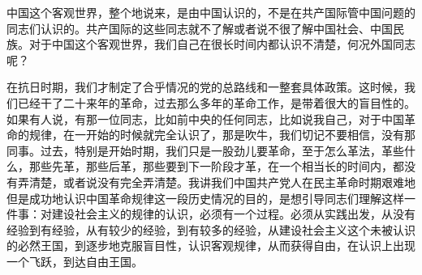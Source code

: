 中国这个客观世界，整个地说来，是由中国认识的，不是在共产国际管中国问题的同志们认识的。共产国际的这些同志就不了解或者说不很了解中国社会、中国民族。对于中国这个客观世界，我们自己在很长时间内都认识不清楚，何况外国同志呢？

在抗日时期，我们才制定了合乎情况的党的总路线和一整套具体政策。这时候，我们已经干了二十来年的革命，过去那么多年的革命工作，是带着很大的盲目性的。如果有人说，有那一位同志，比如前中央的任何同志，比如说我自己，对于中国革命的规律，在一开始的时候就完全认识了，那是吹牛，我们切记不要相信，没有那同事。过去，特别是开始时期，我们只是一股劲儿要革命，至于怎么革法，革些什么，那些先革，那些后革，那些要到下一阶段才革，在一个相当长的时间内，都没有弄清楚，或者说没有完全弄清楚。我讲我们中国共产党人在民主革命时期艰难地但是成功地认识中国革命规律这一段历史情况的目的，是想引导同志们理解这样一件事：对建设社会主义的规律的认识，必须有一个过程。必须从实践出发，从没有经验到有经验，从有较少的经验，到有较多的经验，从建设社会主义这个未被认识的必然王国，到逐步地克服盲目性，认识客观规律，从而获得自由，在认识上出现一个飞跃，到达自由王国。

